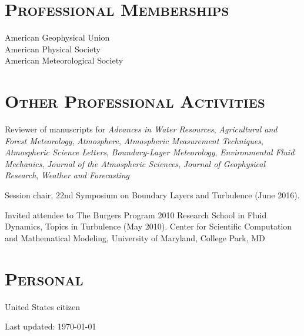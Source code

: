\documentclass[11pt,letterpaper]{article}
\begin{document}
\section*{\textsc{Professional Memberships}} 

American Geophysical Union \\
American Physical Society \\
American Meteorological Society 


\section*{\textsc{Other Professional Activities}} 

Reviewer of manuscripts for \textit{Advances in Water Resources},
\textit{Agricultural and Forest Meteorology},
\textit{Atmosphere},
\textit{Atmospheric Measurement Techniques},
\textit{Atmospheric Science Letters}, \textit{Boundary-Layer Meteorology},
\textit{Environmental Fluid Mechanics}, \textit{Journal of the Atmospheric
  Sciences}, \textit{Journal of Geophysical Research}, \textit{Weather and Forecasting} 

Session chair, 22nd Symposium on Boundary Layers and Turbulence (June 2016).

Invited attendee to The Burgers Program 2010 Research School in Fluid Dynamics, Topics in Turbulence (May 2010). 
Center for Scientific Computation and Mathematical Modeling, University of Maryland, College Park, MD 

\section*{\textsc{Personal}} 
United States citizen

\bigskip
{\small Last updated: \today}
\end{document}
